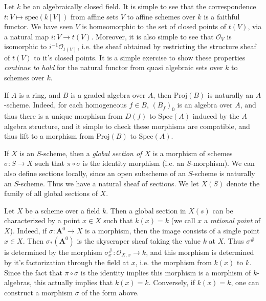 \begin{example}
    Let $k$ be an algebraically closed field. It is simple to see that the correspondence $t: V \mapsto \text{spec}(k[V])$ from affine sets $V$ to affine schemes over $k$ is a faithful functor. We have seen $V$ is homeomorphic to the set of closed points of $t(V)$, via a natural map $i: V \to t(V)$. Moreover, it is also simple to see that $\mathcal{O}_V$ is isomorphic to $i^{-1} \mathcal{O}_{t(V)}$, i.e. the sheaf obtained by restricting the structure sheaf of $t(V)$ to it's closed points. It is a simple exercise to show these properties \emph{continue to hold} for the natural functor from quasi algebraic sets over $k$ to schemes over $k$.
\end{example} 

\begin{example}
    If $A$ is a ring, and $B$ is a graded algebra over $A$, then $\text{Proj}(B)$ is naturally an $A$-scheme. Indeed, for each homogeneous $f \in B$, $(B_f)_0$ is an algebra over $A$, and thus there is a unique morphism from $D(f)$ to $\text{Spec}(A)$ induced by the $A$ algebra structure, and it simple to check these morphisms are compatible, and thus lift to a morphism from $\text{Proj}(B)$ to $\text{Spec}(A)$.
\end{example}

If $X$ is an $S$-scheme, then a \emph{global section of $X$} is a morphism of schemes $\sigma: S \to X$ such that $\pi \circ \sigma$ is the identity morphism (i.e. an $S$-morphism). We can also define sections locally, since an open subscheme of an $S$-scheme is naturally an $S$-scheme. Thus we have a natural sheaf of sections. We let $X(S)$ denote the family of all global sections of $X$.

\begin{example}
    Let $X$ be a scheme over a field $k$. Then a global section in $X(s)$ can be characterized by a point $x \in X$ such that $k(x) = k$ (we call $x$ a \emph{rational point} of $X$). Indeed, if $\sigma: \mathbf{A}^0 \to X$ is a morphism, then the image consists of a single point $x \in X$. Then $\sigma_*(\mathbf{A}^0)$ is the skyscraper sheaf taking the value $k$ at $X$. Thus $\sigma^{\#}$ is determined by the morphism $\sigma^{\#}_x: \mathcal{O}_{X,x} \to k$, and this morphism is determined by it's factorization through the field at $x$, i.e. the morphism from $k(x)$ to $k$. Since the fact that $\pi \circ \sigma$ is the identity implies this morphism is a morphism of $k$-algebras, this actually implies that $k(x) = k$. Conversely, if $k(x) = k$, one can construct a morphism $\sigma$ of the form above.
\end{example}













